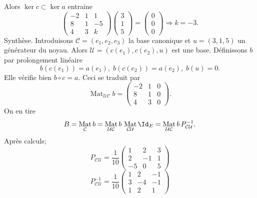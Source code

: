 \begin{enumerate}
Alors $\ker c \subset \ker a$ entraine
\begin{displaymath}
\begin{pmatrix}
-2 & 1 & 1 \\ 8 & 1 & -5 \\ 4 & 3 & k 
\end{pmatrix}
\begin{pmatrix}
 3\\1\\5
\end{pmatrix}
=
\begin{pmatrix}
 0\\0\\0
\end{pmatrix}
\Rightarrow k=-3 .
\end{displaymath}
Synthèse.\newline
Introduisons $\mathcal{C}=(e_1,e_2,e_3)$ la base canonique et $u=(3,1,5)$ un générateur du noyau.\newline
Alors $\mathcal{U}=(c(e_1),c(e_2),u)$ est une base. Définissons $b$ par prolongement linéaire 
\begin{displaymath}
 b(c(e_1))=a(e_1),\; b(c(e_2))=a(e_2),\; b(u)=0.
\end{displaymath}
Elle vérifie bien $b\circ c = a$. Ceci se traduit par
\begin{displaymath}
 \mathop{\mathrm{Mat}}_{\mathcal U \mathcal C}b =
\begin{pmatrix}
 -2 & 1 & 0 \\ 8 & 1 & 0\\ 4 & 3 &0
\end{pmatrix}.
\end{displaymath}
On en tire
\begin{displaymath}
 B = \mathop{\mathrm{Mat}}_{\mathcal C}b
= \mathop{\mathrm{Mat}}_{\mathcal U \mathcal C}b\, \mathop{\mathrm{Mat}}_{\mathcal C \mathcal U }\Id_E
=  \mathop{\mathrm{Mat}}_{\mathcal U \mathcal C}b \, P_{\mathcal{C} \mathcal U }^{-1}.
\end{displaymath}
Après calculs;
\[
 P_{\mathcal{C} \mathcal U }
=\frac{1}{10}
\begin{pmatrix}
 1 & 2 & 3 \\ 2 & -1 & 1 \\ -5 & 0 & 5
\end{pmatrix}
\]
\begin{displaymath}
 P_{\mathcal{C} \mathcal U }^{-1}
=\frac{1}{10}
\begin{pmatrix}
 1 & 2 & -1 \\ 3 & -4 & -1 \\ 1 & 2 & 1

\end{pmatrix}
\end{displaymath}
\end{enumerate}
